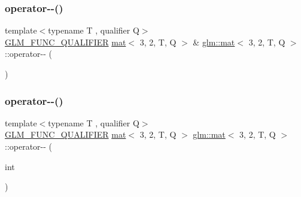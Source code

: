 \subsubsection{\texorpdfstring{operator-\/-\/()}{operator--()}\hspace{0.1cm}{\footnotesize\ttfamily [1/2]}}
{\footnotesize\ttfamily template$<$typename T , qualifier Q$>$ \\
\mbox{\hyperlink{setup_8hpp_a33fdea6f91c5f834105f7415e2a64407}{G\+L\+M\+\_\+\+F\+U\+N\+C\+\_\+\+Q\+U\+A\+L\+I\+F\+I\+ER}} \mbox{\hyperlink{structglm_1_1mat}{mat}}$<$ 3, 2, T, Q $>$ \& \mbox{\hyperlink{structglm_1_1mat}{glm\+::mat}}$<$ 3, 2, T, Q $>$\+::operator-\/-\/ (\begin{DoxyParamCaption}{ }\end{DoxyParamCaption})}

\mbox{\label{structglm_1_1mat_3_013_00_012_00_01_t_00_01_q_01_4_a1d64f18f5052894c3ce72e27ddd23a19}} 
\subsubsection{\texorpdfstring{operator-\/-\/()}{operator--()}\hspace{0.1cm}{\footnotesize\ttfamily [2/2]}}
{\footnotesize\ttfamily template$<$typename T , qualifier Q$>$ \\
\mbox{\hyperlink{setup_8hpp_a33fdea6f91c5f834105f7415e2a64407}{G\+L\+M\+\_\+\+F\+U\+N\+C\+\_\+\+Q\+U\+A\+L\+I\+F\+I\+ER}} \mbox{\hyperlink{structglm_1_1mat}{mat}}$<$ 3, 2, T, Q $>$ \mbox{\hyperlink{structglm_1_1mat}{glm\+::mat}}$<$ 3, 2, T, Q $>$\+::operator-\/-\/ (\begin{DoxyParamCaption}\item[{int}]{ }\end{DoxyParamCaption})}

\mbox{\label{structglm_1_1mat_3_013_00_012_00_01_t_00_01_q_01_4_a0ab9b96cc625abbf3ecec33240d5db7e}} 
